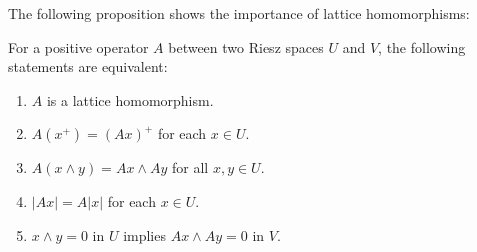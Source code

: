 The following proposition shows the importance of lattice homomorphisms:
\begin{prop}
For a positive operator $A$ between two Riesz spaces $U$ and $V$, the following statements are equivalent:
\begin{enumerate}[\indent(a).]
\item $A$ is a lattice homomorphism.
\item $A(x^+) = (Ax)^+$ for each $x \in U$.
\item $A(x \land y) = Ax \land Ay$ for all $x,y \in U$.
\item $|Ax| = A|x|$ for each $x \in U$.
\item $x\land y = 0$ in $U$ implies $Ax \land Ay = 0$ in $V$. 
\end{enumerate}
\end{prop}


% 
% 
 
% 